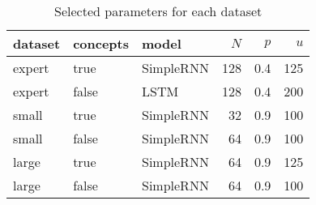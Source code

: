 \begin{table}[h]
\centering
\caption{Selected parameters for each dataset}
\label{table:phase-2-results-a}
\begin{tabular}{lllrrr}
\toprule
dataset & concepts & model & $N$ & $p$ & $u$ \\
\midrule
expert & true & SimpleRNN & 128 & 0.4 & 125 \\
expert & false & LSTM & 128 & 0.4 & 200 \\
small & true & SimpleRNN & 32 & 0.9 & 100 \\
small & false & SimpleRNN & 64 & 0.9 & 100 \\
large & true & SimpleRNN & 64 & 0.9 & 125 \\
large & false & SimpleRNN & 64 & 0.9 & 100 \\
\bottomrule
\end{tabular}
\end{table}

